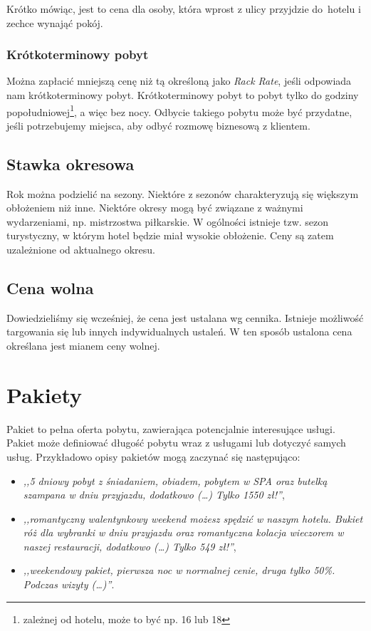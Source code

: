 \documentclass[a4paper,onecolumn,oneside,11pt,wide,floatssmall]{mwrep}
\theoremstyle{definition}
\theoremstyle{plain}%
\theoremstyle{remark}
\begin{document}
Krótko mówiąc, jest to cena dla osoby, która wprost z ulicy przyjdzie \mbox{do 
hotelu} i zechce wynająć pokój.

\subsubsection{Krótkoterminowy pobyt}
Można zapłacić mniejszą cenę niż tą określoną jako \emph{Rack Rate}, jeśli odpowiada 
nam krótkoterminowy pobyt. Krótkoterminowy pobyt to pobyt tylko do godziny 
popołudniowej\footnote{zależnej od hotelu, może to być np. 16 lub 18}, a 
więc bez nocy. Odbycie takiego pobytu może być przydatne, 
jeśli potrzebujemy miejsca, aby odbyć rozmowę biznesową z klientem. 

\subsection{Stawka okresowa}
Rok można podzielić na sezony. Niektóre z sezonów charakteryzują się 
większym obłożeniem niż inne. Niektóre okresy mogą być związane z ważnymi 
wydarzeniami, np. mistrzostwa piłkarskie. W ogólności istnieje tzw. sezon 
turystyczny, w którym hotel będzie miał wysokie obłożenie. Ceny są zatem 
uzależnione od aktualnego okresu.

\subsection{Cena wolna}
Dowiedzieliśmy się wcześniej, że cena jest ustalana wg cennika. Istnieje 
możliwość targowania się lub innych indywidualnych ustaleń. W ten sposób 
ustalona cena określana jest mianem ceny wolnej.

\section{Pakiety}
Pakiet to pełna oferta pobytu, zawierająca potencjalnie interesujące 
usługi. Pakiet może definiować długość pobytu wraz z usługami lub dotyczyć 
samych usług. Przykładowo opisy pakietów mogą zaczynać się następująco:

\begin{itemize}
 \item \textit{,,5 dniowy pobyt z śniadaniem, obiadem, pobytem w SPA oraz butelką 
 szampana w dniu przyjazdu, dodatkowo (\dots) Tylko 1550 zł!''},
 \item \label{pakiet-walentynki} \textit{,,romantyczny walentynkowy weekend możesz spędzić w naszym hotelu. 
 Bukiet róż dla wybranki w dniu przyjazdu oraz romantyczna kolacja wieczorem 
 w naszej restauracji, dodatkowo (\dots) Tylko 549 zł!''},
 \item \textit{,,weekendowy pakiet, pierwsza noc w normalnej cenie, druga tylko 50\%. 
 Podczas wizyty (\dots)''}.
\end{itemize}
\end{document}
